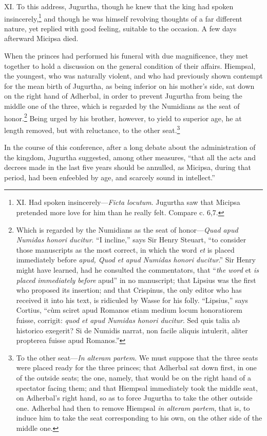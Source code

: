 XI. To this address, Jugurtha, though he knew that the king had spoken
insincerely,\footnote{XI. Had spoken insincerely—\emph{Ficta locutum}. Jugurtha saw
that Micipsa pretended more love for him than he really felt. Compare
c. 6,7.} and though he was himself revolving thoughts of a far
different nature, yet replied with good feeling, suitable to the
occasion. A few days afterward Micipsa died.

When the princes had performed his funeral with due magnificence, they
met together to hold a discussion on the general condition of their
affairs. Hiempsal, the youngest, who was naturally violent, and who
had previously shown contempt for the mean birth of Jugurtha, as being
inferior on his mother's side, sat down on the right hand of Adherbal,
in order to prevent Jugurtha from being the middle one of the three,
which is regarded by the Numidians as the seat of honor.\footnote{Which is regarded by the Numidians as the seat of honor—\emph{Quad
apud Numidas honori ducitur}. ``I incline,'' says Sir Henry Steuart,
``to consider those manuscripts as the most correct, in which the word
\emph{et} is placed immediately before \emph{apud, Quod et apud Numidas honori
ducitur}.'' Sir Henry might have learned, had he consulted the
commentators, that ``\emph{the word} et \emph{is placed immediately before}
apud'' in no manuscript; that Lipsius was the first who proposed its
insertion; and that Crispinus, the only editor who has received it
into his text, is ridiculed by Wasse for his folly. ``Lipsius,'' says
Cortius, ``cùm sciret apud Romanos etiam medium locum honoratiorem
fuisse, corrigit: \emph{quod et apud Numidas honori ducitur}. Sed quis
talia ab historico exegerit? Si de Numidis narrat, non facile aliquis
intulerit, aliter propterea fuisse apud Romanos.''} Being
urged by his brother, however, to yield to superior age, he at length
removed, but with reluctance, to the other seat.\footnote{To the other seat—\emph{In alteram partem}. We must suppose that
the three seats were placed ready for the three princes; that Adherbal
sat down first, in one of the outside seats; the one, namely, that
would be on the right hand of a spectator facing them; and that
Hiempsal immediately took the middle seat, on Adherbal's right hand,
so as to force Jugurtha to take the other outside one. Adherbal had
then to remove Hiempsal \emph{in alteram partem}, that is, to induce him to
take the seat corresponding to his own, on the other side of the
middle one.}

In the course of this conference, after a long debate about the
administration of the kingdom, Jugurtha suggested, among other
measures, ``that all the acts and decrees made in the last five years
should be annulled, as Micipsa, during that period, had been enfeebled
by age, and scarcely sound in intellect.''


